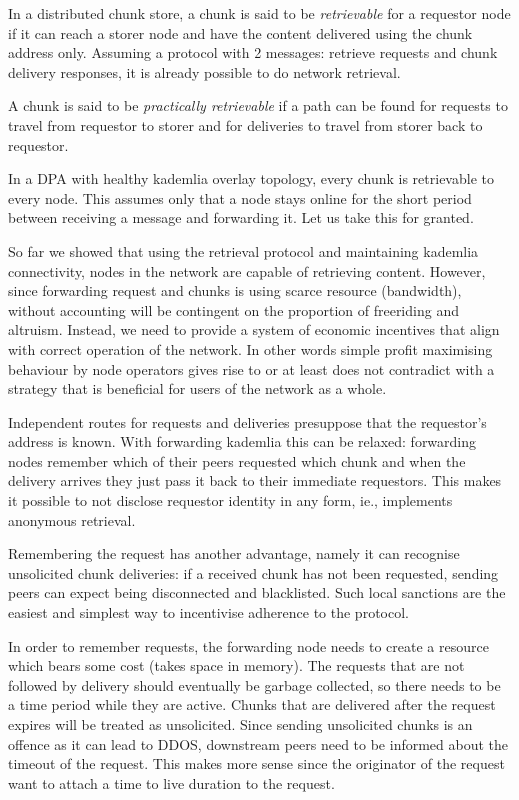 \documentclass[a4paper,10pt,fullpage]{article}
\numberwithin{equation}{section}
\theoremstyle{definition}
\begin{document}
In a distributed chunk store, a chunk is said to be \emph{retrievable} for a  requestor node if it can reach a storer node and have the content delivered using the chunk address only.
Assuming a protocol with 2 messages: retrieve requests and chunk delivery responses, it is already possible to do network retrieval.

A chunk is said to be \emph{practically retrievable} if a path can be found for requests to travel from requestor to storer and for deliveries to travel from storer back to requestor. 



In a DPA with healthy kademlia overlay topology, every chunk  is retrievable to every node. This assumes only that a node stays online for the short period between receiving a message and forwarding it. Let us take this for granted. 

So far we showed that using the retrieval protocol and maintaining kademlia connectivity, nodes in the network are capable of retrieving content. 
However, since forwarding request and chunks is using scarce resource (bandwidth), without accounting will be contingent on the proportion of freeriding and altruism. Instead, we need to provide a system of economic incentives that align with correct operation of the network. In other words simple profit maximising behaviour by node operators gives rise to or at least does not contradict with a strategy that is beneficial for users of the network as a whole.

Independent routes for requests and deliveries presuppose that the requestor's address is known. With forwarding kademlia this can be relaxed: forwarding nodes remember which of their peers requested which chunk and when the delivery arrives they just pass it back to their immediate requestors. This makes it possible to not disclose requestor identity in any form, ie., implements anonymous retrieval. 

Remembering the request has another advantage, namely it can recognise unsolicited chunk deliveries: if a received chunk has not been requested, sending peers can expect being disconnected and blacklisted. Such local sanctions are the easiest and simplest way to incentivise adherence to the protocol. 

In order to remember requests, the forwarding node needs to create a resource which bears some cost (takes space in memory). The requests that are not followed by delivery should eventually be garbage collected, so there needs to be a time period while they are active. Chunks that are delivered after the request expires will be treated as unsolicited. Since sending unsolicited chunks is an offence as it can lead to DDOS, downstream peers need to be informed about the timeout of the request.
This makes more sense since the originator of the request want to attach a time to live duration to the request.
\end{document}
